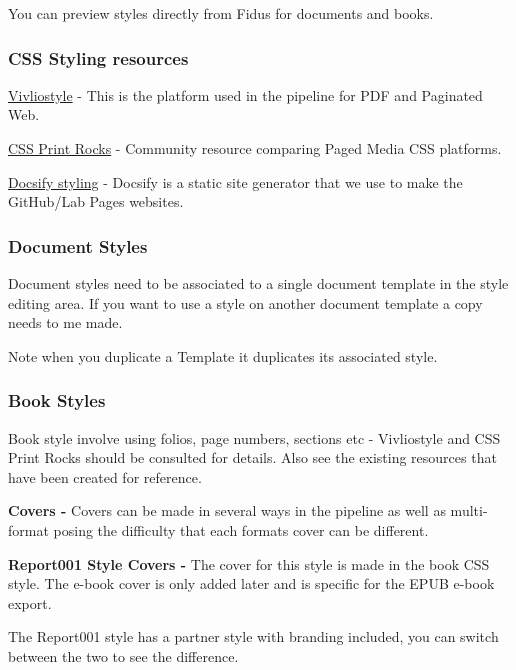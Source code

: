 \documentclass{article}
\begin{document}
You can preview styles directly from Fidus for documents and books.


\subsubsection{CSS Styling resources}\label{H9519487}



\href{https://vivliostyle.org/}{Vivliostyle} - This is the platform used in the pipeline for PDF and Paginated Web.


\href{https://www.print-css.rocks/}{CSS Print Rocks} - Community resource comparing Paged Media CSS platforms.


\href{https://docsify.js.org/#/}{Docsify styling}  - Docsify is a static site generator that we use to make the GitHub/Lab Pages websites.


\subsubsection{Document Styles}\label{H4585161}



Document styles need to be associated to a single document template in the style editing area. If you want to use a style on another document template a copy needs to me made.


Note when you duplicate a Template it duplicates its associated style.


\subsubsection{Book Styles}\label{H5506698}



Book style involve using folios, page numbers, sections etc - Vivliostyle and CSS Print Rocks should be consulted for details. Also see the existing resources that have been created for reference.


\textbf{Covers -} Covers can be made in several ways in the pipeline as well as multi-format posing the difficulty that each formats cover can be different.


\textbf{Report001 Style Covers - }The cover for this style is made in the book CSS style. The e-book cover is only added later and is specific for the EPUB e-book export.


The Report001 style has a partner style with branding included, you can switch between the two to see the difference.
\end{document}
